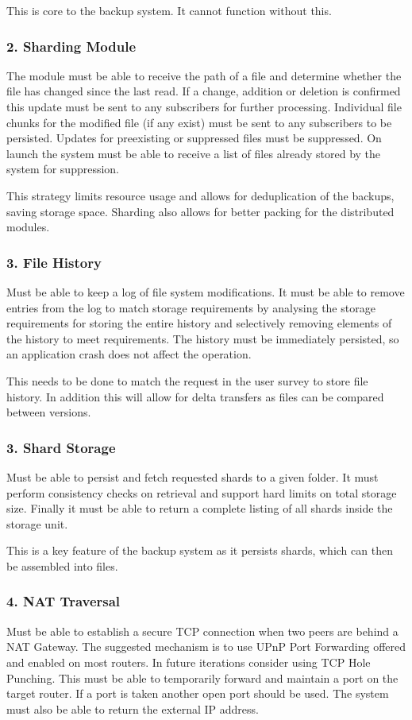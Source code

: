 \documentclass[11pt, a4paper, twocolumn, twoside]{report}
\begin{document}
This is core to the backup system. It cannot function without this.

\subsubsection{2. Sharding Module}
The module must be able to receive the path of a file and determine whether the file has changed since the last read. If a change, addition or deletion is confirmed this update must be sent to any subscribers for further processing. Individual file chunks for the modified file (if any exist) must be sent to any subscribers to be persisted. Updates for preexisting or suppressed files must be suppressed. On launch the system must be able to receive a list of files already stored by the system for suppression.

This strategy limits resource usage and allows for deduplication of the backups, saving storage space. Sharding also allows for better packing for the distributed modules.

\subsubsection{3. File History}
Must be able to keep a log of file system modifications. It must be able to remove entries from the log to match storage requirements by analysing the storage requirements for storing the entire history and selectively removing elements of the history to meet requirements. The history must be immediately persisted, so an application crash does not affect the operation.

This needs to be done to match the request in the user survey to store file history. In addition this will allow for delta transfers as files can be compared between versions.

\subsubsection{3. Shard Storage}
Must be able to persist and fetch requested shards to a given folder. It must perform consistency checks on retrieval and support hard limits on total storage size. Finally it must be able to return a complete listing of all shards inside the storage unit.

This is a key feature of the backup system as it persists shards, which can then be assembled into files.

\subsubsection{4. NAT Traversal}
Must be able to establish a secure TCP connection when two peers are behind a NAT Gateway. The suggested mechanism is to use UPnP Port Forwarding offered and enabled on most routers. In future iterations consider using TCP Hole Punching. This must be able to temporarily forward and maintain a port on the target router. If a port is taken another open port should be used. The system must also be able to return the external IP address.
\end{document}
